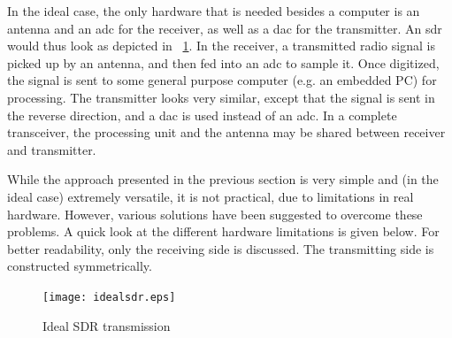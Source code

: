 In the ideal case, the only hardware that is needed besides a computer is an antenna and an \gls{adc} for the receiver, as well as a \gls{dac} for the transmitter. An \gls{sdr} would thus look as depicted in {~\cref{fig:idealsdr}}. In the receiver, a transmitted radio signal is picked up by an antenna, and then fed into an \gls{adc} to sample it. Once digitized, the signal is sent to some general purpose computer (e.g. an embedded PC) for processing. The transmitter looks very similar, except that the signal is sent in the reverse direction, and a \gls{dac} is used instead of an \gls{adc}. In a complete transceiver, the processing unit and the antenna may be shared between receiver and transmitter.

While the approach presented in the previous section is very simple and (in the ideal case) extremely versatile, it is not practical, due to limitations in real hardware. However, various solutions have been suggested to overcome these problems. A quick look at the different hardware limitations is given below. For better readability, only the receiving side is discussed. The transmitting side is constructed symmetrically.
%
\begin{figure}[thb]
\centering
\texttt{[image: idealsdr.eps]}
\caption{Ideal SDR transmission\label{fig:idealsdr}}
\end{figure}
%
